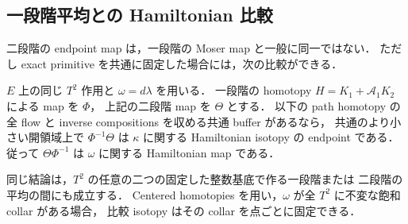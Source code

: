 \subsection{一段階平均との Hamiltonian 比較}

二段階の endpoint map は，一段階の Moser map と一般に同一ではない．
ただし exact primitive を共通に固定した場合には，次の比較ができる．

\begin{proposition}
\label{ke:staged-hamiltonian-comparison}
$E$ 上の同じ $T^2$ 作用と $\omega=d\lambda$ を用いる．
一段階の homotopy $H=K_1+\mathcal A_1K_2$ による map を $\Phi$，
上記の二段階 map を $\Theta$ とする．
以下の path homotopy の全 flow と inverse compositions を収める共通 buffer があるなら，
共通のより小さい開領域上で $\Phi^{-1}\Theta$ は
$\kappa$ に関する Hamiltonian isotopy の endpoint である．
従って $\Theta\Phi^{-1}$ は $\omega$ に関する Hamiltonian map である．

同じ結論は，$T^2$ の任意の二つの固定した整数基底で作る一段階または
二段階の平均の間にも成立する．
Centered homotopies を用い，$\omega$ が全 $T^2$ に不変な飽和 collar がある場合，
比較 isotopy はその collar を点ごとに固定できる．
\end{proposition}
